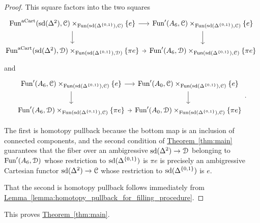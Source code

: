 \documentclass[main.tex]{subfiles}
\begin{document}
\begin{proof}
  This square factors into the two squares
  \begin{equation*}
    \noindent\makebox[\textwidth]{%
      \begin{tikzcd}[ampersand replacement=\&, column sep=tiny]
        \Fun^{\aCart}(\sd(\Delta^{2}), \category{C}) \times_{\Fun(\sd(\Delta^{\{0, 1\}}), \category{C})} \{e\}
        \arrow[r]
        \arrow[d]
        \& \Fun'(A_{6}, \category{C}) \times_{\Fun(\sd(\Delta^{\{0, 1\}}), \category{C})} \{e\}
        \arrow[d]
        \\
        \Fun^{\aCart}(\sd(\Delta^{2}), \category{D}) \times_{\Fun(\sd(\Delta^{\{0, 1\}}), \category{D})} \{\pi e\}
        \arrow[r]
        \& \Fun'(A_{6}, \category{D}) \times_{\Fun(\sd(\Delta^{\{0, 1\}}), \category{C})} \{\pi e\}
      \end{tikzcd}
    }
  \end{equation*}
  and
  \begin{equation*}
    \noindent\makebox[\textwidth]{%
      \begin{tikzcd}[ampersand replacement=\&, column sep=tiny]
        \Fun'(A_{6}, \category{C}) \times_{\Fun(\sd(\Delta^{\{0, 1\}}), \category{C})} \{e\}
        \arrow[r]
        \arrow[d]
        \& \Fun'(A_{0}, \category{C}) \times_{\Fun(\sd(\Delta^{\{0, 1\}}), \category{C})} \{e\}
        \arrow[d]
        \\
        \Fun'(A_{6}, \category{D}) \times_{\Fun(\sd(\Delta^{\{0, 1\}}), \category{C})} \{\pi e\}
        \arrow[r]
        \& \Fun'(A_{0}, \category{D}) \times_{\Fun(\sd(\Delta^{\{0, 1\}}), \category{C})} \{\pi e\}
      \end{tikzcd}.
    }
  \end{equation*}

  The first is homotopy pullback because the bottom map is an inclusion of connected components, and the second condition of \hyperref[thm:main]{Theorem~\ref*{thm:main}} guarantees that the fiber over an ambigressive $\mathrm{sd}(\Delta^{2}) \to \mathcal{D}$ belonging to $\mathrm{Fun}'(A_{6}, \mathcal{D})$ whose restriction to $\mathrm{sd}(\Delta^{\{0, 1\}})$ is $\pi e$ is precisely an ambigressive Cartesian functor $\mathrm{sd}(\Delta^{2}) \to \mathcal{C}$ whose restriction to $\mathrm{sd}(\Delta^{\{0, 1\}})$ is $e$.

  That the second is homotopy pullback follows immediately from \hyperref[lemma:homotopy_pullback_for_filling_procedure]{Lemma~\ref*{lemma:homotopy_pullback_for_filling_procedure}}.
\end{proof}

This proves \hyperref[thm:main]{Theorem~\ref*{thm:main}}.
\end{document}
